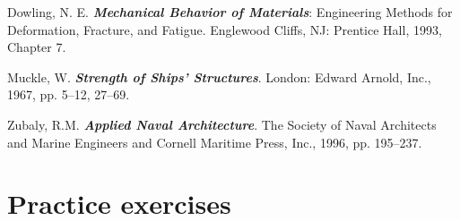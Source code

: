 \documentclass{AeroStructure-ERJohnson}
\begin{document}
\begin{thebibliography}{}\label{sec4.5}
\bibitem{} Dowling, N. E. \textit{\textbf{Mechanical Behavior of Materials}}: Engineering Methods for Deformation, Fracture, and Fatigue. Englewood Cliffs, NJ: Prentice Hall, 1993, Chapter 7.\label{Dowling}

\bibitem{} Muckle, W. \textit{\textbf{Strength of Ships' Structures}}. London: Edward Arnold, Inc., 1967, pp. 5--12, 27--69.

\bibitem{} Zubaly, R.M. \textit{\textbf{Applied Naval Architecture}}. The Society of Naval Architects and Marine Engineers and Cornell Maritime Press, Inc., 1996, pp. 195--237.
\end{thebibliography}

\vspace*{-15pt}
\section{Practice exercises}\label{sec4.6}
\end{document}
